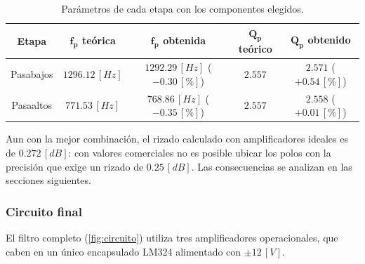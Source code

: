 \begin{table}[H]
    \centering
    \caption{Parámetros de cada etapa con los componentes elegidos.}
    \label{tab:comp}
    \begin{tabular}{|c|c|c|c|c|}
        \hline
        \textbf{Etapa} & $\boldsymbol{f_p}$ \textbf{teórica} & $\boldsymbol{f_p}$ \textbf{obtenida} & $\boldsymbol{Q_p}$ \textbf{teórico} & $\boldsymbol{Q_p}$ \textbf{obtenido} \\
        \hline
        Pasabajos & $1296.12 \, [Hz]$ & $1292.29 \, [Hz]$ ($-0.30 \, [\%]$) & $2.557$ & $2.571$ ($+0.54 \, [\%]$) \\
        Pasaaltos & $771.53 \, [Hz]$  & $768.86 \, [Hz]$ ($-0.35 \, [\%]$)  & $2.557$ & $2.558$ ($+0.01 \, [\%]$) \\
        \hline
    \end{tabular}
\end{table}

Aun con la mejor combinación, el rizado calculado con amplificadores ideales es de $0.272 \, [dB]$: con valores comerciales no es posible ubicar los polos con la precisión que exige un rizado de $0.25 \, [dB]$. Las consecuencias se analizan en las secciones siguientes.

\subsubsection{Circuito final}
El filtro completo (\autoref{fig:circuito}) utiliza tres amplificadores operacionales, que caben en un único encapsulado LM324 \cite{lm324} alimentado con $\pm 12 \, [V]$.

